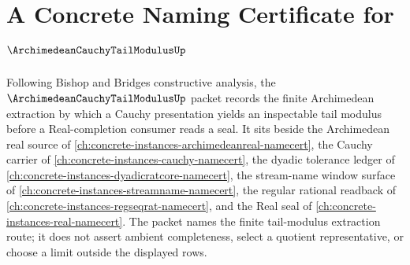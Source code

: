 \chapter{A Concrete Naming Certificate for $\ArchimedeanCauchyTailModulusUp$}
\label{ch:concrete-instances-archimedean-cauchy-tail-modulus-namecert}

Following Bishop and Bridges constructive analysis, the $\ArchimedeanCauchyTailModulusUp$ packet records the finite Archimedean extraction by which a Cauchy presentation yields an inspectable tail modulus before a Real-completion consumer reads a seal. It sits beside the Archimedean real source of \autoref{ch:concrete-instances-archimedeanreal-namecert}, the Cauchy carrier of \autoref{ch:concrete-instances-cauchy-namecert}, the dyadic tolerance ledger of \autoref{ch:concrete-instances-dyadicratcore-namecert}, the stream-name window surface of \autoref{ch:concrete-instances-streamname-namecert}, the regular rational readback of \autoref{ch:concrete-instances-regseqrat-namecert}, and the Real seal of \autoref{ch:concrete-instances-real-namecert}. The packet names the finite tail-modulus extraction route; it does not assert ambient completeness, select a quotient representative, or choose a limit outside the displayed rows.

